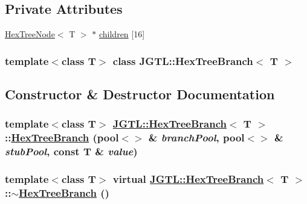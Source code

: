 \subsection*{Private Attributes}
\begin{CompactItemize}
\item 
\hyperlink{class_j_g_t_l_1_1_hex_tree_node}{Hex\-Tree\-Node}$<$ T $>$ $\ast$ \hyperlink{class_j_g_t_l_1_1_hex_tree_branch_9917ee19fc32f342d487cb9d887887da}{children} \mbox{[}16\mbox{]}
\end{CompactItemize}
\subsubsection*{template$<$class T$>$ class JGTL::Hex\-Tree\-Branch$<$ T $>$}



\subsection{Constructor \& Destructor Documentation}
\hypertarget{class_j_g_t_l_1_1_hex_tree_branch_d7db0d8efdf004a111fc3e690e4382f5}{
\subsubsection[HexTreeBranch]{\setlength{\rightskip}{0pt plus 5cm}template$<$class T$>$ \hyperlink{class_j_g_t_l_1_1_hex_tree_branch}{JGTL::Hex\-Tree\-Branch}$<$ T $>$::\hyperlink{class_j_g_t_l_1_1_hex_tree_branch}{Hex\-Tree\-Branch} (pool$<$$>$ \& {\em branch\-Pool}, pool$<$$>$ \& {\em stub\-Pool}, const T \& {\em value})}}
\label{class_j_g_t_l_1_1_hex_tree_branch_d7db0d8efdf004a111fc3e690e4382f5}


\hypertarget{class_j_g_t_l_1_1_hex_tree_branch_72074225e2a22d7bf9642f47d67d8b05}{
\subsubsection[$\sim$HexTreeBranch]{\setlength{\rightskip}{0pt plus 5cm}template$<$class T$>$ virtual \hyperlink{class_j_g_t_l_1_1_hex_tree_branch}{JGTL::Hex\-Tree\-Branch}$<$ T $>$::$\sim$\hyperlink{class_j_g_t_l_1_1_hex_tree_branch}{Hex\-Tree\-Branch} ()}}
\label{class_j_g_t_l_1_1_hex_tree_branch_72074225e2a22d7bf9642f47d67d8b05}




